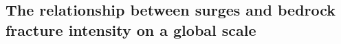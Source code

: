 \documentclass[review]{igs}
\begin{document}

\subsection{The relationship between surges and bedrock fracture intensity on a global scale}
\end{document}
